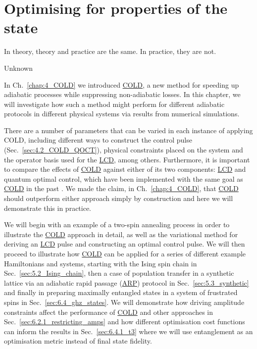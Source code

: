 \documentclass[a4paper,oneside,11pt]{book}
\newcommand{\acrref}[1]{\hyperref[acr:#1]{#1}}
\begin{document}
\chapter{Optimising for properties of the state}\label{chap:6_Applications_fidelity}

\epigraph{In theory, theory and practice are the same. In practice, they are not.}{Unknown}

In Ch.~\ref{chap:4_COLD} we introduced \acrref{COLD}, a new method for speeding up adiabatic processes while suppressing non-adiabatic losses. In this chapter, we will investigate how such a method might perform for different adiabatic protocols in different physical systems via results from numerical simulations. 

There are a number of parameters that can be varied in each instance of applying COLD, including different ways to construct the control pulse (Sec.~\ref{sec:4.2_COLD_QOCT}), physical constraints placed on the system and the operator basis used for the \acrref{LCD}, among others. Furthermore, it is important to compare the effects of \acrref{COLD} against either of its two components: \acrref{LCD} and quantum optimal control, which have been implemented with the same goal as \acrref{COLD} in the past \cite{sels_minimizing_2017, glaser_training_2015, guery-odelin_shortcuts_2019}. We made the claim, in Ch.~\ref{chap:4_COLD}, that \acrref{COLD} should outperform either approach simply by construction and here we will demonstrate this in practice.

We will begin with an example of a two-spin annealing process in order to illustrate the \acrref{COLD} approach in detail, as well as the variational method for deriving an \acrref{LCD} pulse and constructing an optimal control pulse. We will then proceed to illustrate how \acrref{COLD} can be applied for a series of different example Hamiltonians and systems, starting with the Ising spin chain in Sec.~\ref{sec:5.2_Ising_chain}, then a case of population transfer in a synthetic lattice via an adiabatic rapid passage (\acrref{ARP}) protocol in Sec.~\ref{sec:5.3_synthetic} and finally in preparing maximally entangled states in a system of frustrated spins in Sec.~\ref{sec:6.4_ghz_states}. We will demonstrate how driving amplitude constraints affect the performance of \acrref{COLD} and other approaches in Sec.~\ref{sec:6.2.1_restricting_amps} and how different optimisation cost functions can inform the results in Sec.~\ref{sec:6.4.1_t3} where we will use entanglement as an optimisation metric instead of final state fidelity.
\end{document}
